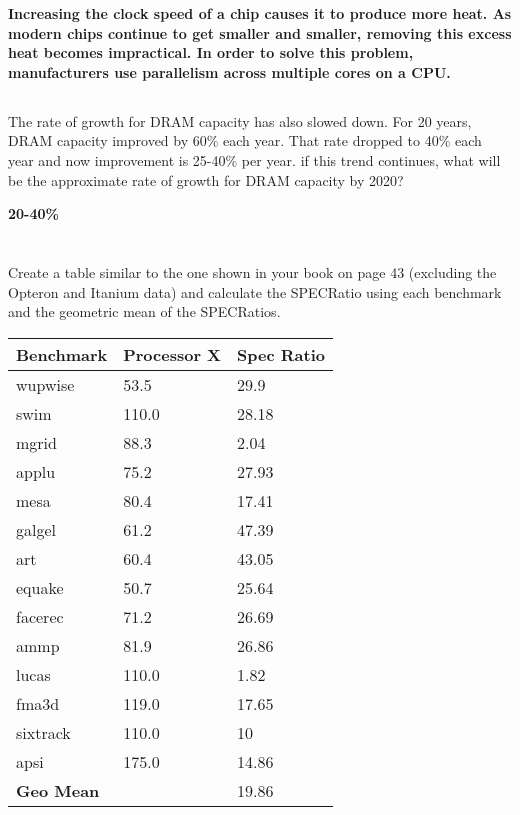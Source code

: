 \documentclass{article}
\begin{document}
\begin{adjustwidth}{2.5em}{0pt}
\vspace{5mm}
\textbf{Increasing the clock speed of a chip causes it to produce more heat. As modern chips continue to get smaller and smaller, removing this excess heat becomes impractical. In order to solve this problem, manufacturers use parallelism across multiple cores on a CPU.}
\subsection{}
The rate of growth for DRAM capacity has also slowed down. For 20 years, DRAM capacity improved by 60\% each year. That rate dropped to 40\% each year and now improvement is 25-40\% per year. if this trend continues, what will be the approximate rate of growth for DRAM capacity by 2020?  

\vspace{5mm}
\textbf{20-40\%}

\pagebreak

\end{adjustwidth}
\section{}

\subsection{}
Create a table similar to the one shown in your book on page 43 (excluding the Opteron and Itanium data) and calculate the SPECRatio using each benchmark and the geometric mean of the SPECRatios.

\begin{multicols}{3} 
\begin{tabular}{|l|l|l|}
\hline
\textbf{Benchmark} & \textbf{Processor X} & \textbf{Spec Ratio}\\
\hline
wupwise & 53.5 & 29.9\\
swim & 110.0 & 28.18\\ 
mgrid & 88.3 & 2.04\\
applu & 75.2 & 27.93\\
mesa & 80.4 & 17.41\\
galgel & 61.2 & 47.39\\
art & 60.4 & 43.05\\
equake & 50.7 & 25.64 \\
facerec & 71.2 & 26.69\\
ammp & 81.9 & 26.86 \\
lucas & 110.0 & 1.82 \\
fma3d & 119.0 & 17.65 \\ 
sixtrack & 110.0 & 10\\
apsi & 175.0 & 14.86\\
\hline
\multicolumn{2}{|l|}{\textbf{Geo Mean}} & 19.86 \\
\hline	
\end{tabular}
\end{multicols}
\end{document}
